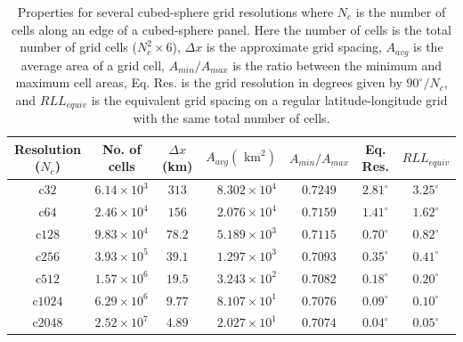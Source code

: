 \documentclass{ametsoc}
\begin{document}
%
\begin{table}[t]
    \caption{Properties for several cubed-sphere grid resolutions where 
    $N_c$ is the number of cells along an edge of a cubed-sphere panel.
    Here the number of cells is the total number of grid cells 
    ($N_c^2 \times 6$), $\Delta x$ is the approximate grid spacing, 
    $A_{avg}$ is the average area of a grid cell, $A_{min}/A_{max}$ is the
    ratio between the minimum and maximum cell areas, Eq.  Res.  is the
    grid resolution in degrees given by $90^\circ / N_c$, and $RLL_{equiv}$
    is the equivalent grid spacing on a regular latitude-longitude
    grid with the same total number of cells.}%
    \label{tb:grids2}
    \begin{center}
    \begin{tabular}{cccrccc}
            \hline
            Resolution ($N_c$) & No. of cells       & $\Delta x$ (km) & $A_{avg} (\mbox{ km}^2)$ & $A_{min}/A_{max}$ & Eq. Res.     & $RLL_{equiv}$ \\ 
            \hline
            \hline
            c$32$              & $6.14 \times 10^3$ & $313$           & $8.302 \times 10^{4}$    & $0.7249$          & $2.81^\circ$ & $3.25^\circ$  \\ 
            c$64$              & $2.46 \times 10^4$ & $156$           & $2.076 \times 10^{4}$    & $0.7159$          & $1.41^\circ$ & $1.62^\circ$  \\ 
            c$128$             & $9.83 \times 10^4$ & $78.2$          & $5.189 \times 10^{3}$    & $0.7115$          & $0.70^\circ$ & $0.82^\circ$  \\ 
            c$256$             & $3.93 \times 10^5$ & $39.1$          & $1.297 \times 10^{3}$    & $0.7093$          & $0.35^\circ$ & $0.41^\circ$  \\ 
            c$512$             & $1.57 \times 10^6$ & $19.5$          & $3.243 \times 10^{2}$    & $0.7082$          & $0.18^\circ$ & $0.20^\circ$  \\ 
            c$1024$           & $6.29 \times 10^6$ & $9.77$          & $8.107 \times 10^{1}$    & $0.7076$          & $0.09^\circ$ & $0.10^\circ$  \\ 
            c$2048$           & $2.52 \times 10^7$ & $4.89$          & $2.027 \times 10^{1}$   & $0.7074$          & $0.04^\circ$ & $0.05^\circ$ \\
            \hline
        \end{tabular}
    \end{center}
\end{table}
\end{document}
